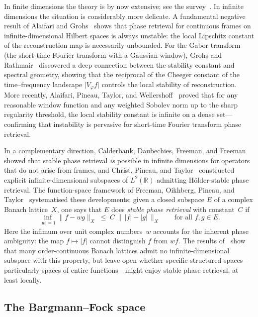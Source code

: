 \documentclass[11pt]{amsart}
\theoremstyle{definition}
\theoremstyle{remark}
\newcommand{\R}{\mathbb{R}}
\newcommand{\abs}[1]{\lvert #1 \rvert}
\newcommand{\norm}[1]{\lVert #1 \rVert}
\begin{document}
In finite dimensions the theory is by now extensive; see the
survey~\cite{grohs2020survey}.  In infinite dimensions the situation is
considerably more delicate.  A fundamental negative result of Alaifari and
Grohs~\cite{alaifari2017continuous} shows that phase retrieval for continuous
frames on infinite-dimensional Hilbert spaces is always unstable: the local
Lipschitz constant of the reconstruction map is necessarily unbounded.  For
the Gabor transform (the short-time Fourier transform with a Gaussian
window), Grohs and Rathmair~\cite{grohs2020survey} discovered a deep
connection between the stability constant and spectral geometry, showing that
the reciprocal of the Cheeger constant of the time--frequency landscape
$\abs{V_\varphi f}$ controls the local stability of reconstruction.  More
recently, Alaifari, Pineau, Taylor, and
Wellershoff~\cite{alaifari2021gabor} proved that for any reasonable
window function and any weighted Sobolev norm up to the sharp regularity
threshold, the local stability constant is infinite on a dense set---confirming
that instability is pervasive for short-time Fourier transform phase retrieval.

In a complementary direction, Calderbank, Daubechies, Freeman, and
Freeman~\cite{calderbank2022stable} showed that stable phase retrieval
\emph{is} possible in infinite dimensions for operators that do not arise from
frames, and Christ, Pineau, and Taylor~\cite{christ2022examples} constructed
explicit infinite-dimensional subspaces of $L^2(\R)$ admitting H\"older-stable
phase retrieval.  The function-space framework of Freeman, Oikhberg, Pineau,
and Taylor~\cite{FOTP} systematised these developments: given a closed
subspace $E$ of a complex Banach lattice~$X$, one says that $E$ does
\emph{stable phase retrieval} with constant~$C$ if
\[
\inf_{\abs{w}=1}\norm{f - wg}_X
\;\le\;
C\,\bigl\|\,\abs{f} - \abs{g}\,\bigr\|_X
\qquad
\text{for all } f,g \in E.
\]
Here the infimum over unit complex numbers~$w$ accounts for the inherent
phase ambiguity: the map $f \mapsto \abs{f}$ cannot distinguish $f$ from
$wf$.  The results of~\cite{FOTP} show that many order-continuous Banach
lattices admit no infinite-dimensional subspace with this property, but leave
open whether specific structured spaces---particularly spaces of entire
functions---might enjoy stable phase retrieval, at least locally.

\subsection{The Bargmann--Fock space}
\end{document}

